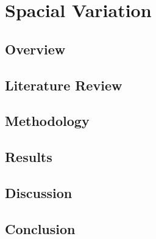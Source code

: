 \chapter{Spacial Variation}
\section{Overview}
\section{Literature Review}
\section{Methodology}
\section{Results}
\section{Discussion}
\section{Conclusion}